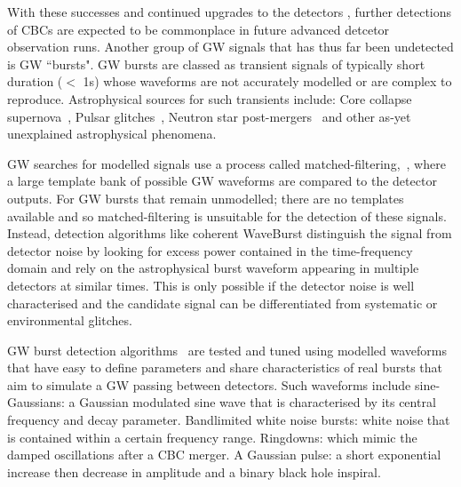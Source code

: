 \documentclass[12pt]{iopart}
\newcommand{\chris}[1]{\textbf{\textcolor{green}{CHRIS: #1}}}
\begin{document}
%
With these successes and continued upgrades to the detectors \cite{det-upgrades1,det-upgrades2}, further
detections of \acp{CBC} are expected to be commonplace in future advanced
detcetor observation runs. Another group of GW signals that has thus far
been undetected is GW ``bursts". GW bursts are classed as transient
signals of typically short duration ($<$ 1s) whose waveforms are not accurately
modelled or are complex to reproduce. Astrophysical sources for such transients
include: Core collapse supernova~\cite{Fryer_2003}, Pulsar
glitches~\cite{Andersson_2001}, Neutron star post-mergers~\cite{Baiotti_2007}
and other as-yet unexplained astrophysical phenomena. 

%
GW searches for modelled signals use a process called
matched-filtering,~\cite{Owen1998,Usman_2016,sachdev2019gstlal}, where a large template bank of possible
GW waveforms are compared to the detector outputs. For GW bursts that remain unmodelled; there are no
templates available and so matched-filtering is unsuitable for the detection of
these signals.  Instead, detection algorithms like coherent WaveBurst \cite{drago2020coherent} distinguish the signal from
detector noise by looking for excess power contained in the time-frequency
domain and rely on the
astrophysical burst waveform appearing in multiple detectors at similar times.
This is only possible if the detector noise is well characterised and the
candidate signal can be differentiated from systematic or environmental
glitches. 

%
GW burst detection algorithms~\cite{drago2020coherent,Klimenko_2008, Aso_2008} are tested
and tuned using modelled waveforms that have easy to define parameters and share characteristics of real bursts that aim to simulate a GW passing between
detectors. Such waveforms include sine-Gaussians: a
Gaussian modulated sine wave that is characterised by its central frequency and
decay parameter. Bandlimited white noise bursts: white noise that is contained
within a certain frequency range. Ringdowns: which mimic the damped
oscillations after a \ac{CBC} merger. A Gaussian pulse: a short exponential increase then decrease in amplitude and a binary black hole inspiral.
%

\end{document}
